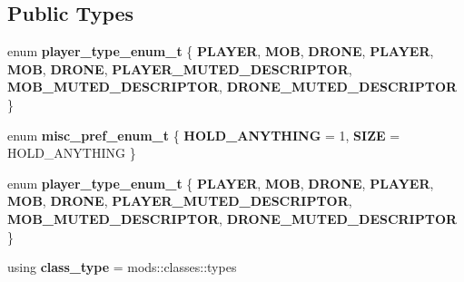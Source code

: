 \subsection*{Public Types}
\begin{DoxyCompactItemize}
\item 
\mbox{\label{classmods_1_1player_ac499124d36e96d5513a0798f12b0d1ed}} 
enum {\bfseries player\+\_\+type\+\_\+enum\+\_\+t} \{ \newline
{\bfseries P\+L\+A\+Y\+ER}, 
{\bfseries M\+OB}, 
{\bfseries D\+R\+O\+NE}, 
{\bfseries P\+L\+A\+Y\+ER}, 
\newline
{\bfseries M\+OB}, 
{\bfseries D\+R\+O\+NE}, 
{\bfseries P\+L\+A\+Y\+E\+R\+\_\+\+M\+U\+T\+E\+D\+\_\+\+D\+E\+S\+C\+R\+I\+P\+T\+OR}, 
{\bfseries M\+O\+B\+\_\+\+M\+U\+T\+E\+D\+\_\+\+D\+E\+S\+C\+R\+I\+P\+T\+OR}, 
\newline
{\bfseries D\+R\+O\+N\+E\+\_\+\+M\+U\+T\+E\+D\+\_\+\+D\+E\+S\+C\+R\+I\+P\+T\+OR}
 \}
\item 
\mbox{\label{classmods_1_1player_af6141b184d0742dc2d94dd04c390069d}} 
enum {\bfseries misc\+\_\+pref\+\_\+enum\+\_\+t} \{ {\bfseries H\+O\+L\+D\+\_\+\+A\+N\+Y\+T\+H\+I\+NG} = 1, 
{\bfseries S\+I\+ZE} = H\+O\+L\+D\+\_\+\+A\+N\+Y\+T\+H\+I\+NG
 \}
\item 
\mbox{\label{classmods_1_1player_ac499124d36e96d5513a0798f12b0d1ed}} 
enum {\bfseries player\+\_\+type\+\_\+enum\+\_\+t} \{ \newline
{\bfseries P\+L\+A\+Y\+ER}, 
{\bfseries M\+OB}, 
{\bfseries D\+R\+O\+NE}, 
{\bfseries P\+L\+A\+Y\+ER}, 
\newline
{\bfseries M\+OB}, 
{\bfseries D\+R\+O\+NE}, 
{\bfseries P\+L\+A\+Y\+E\+R\+\_\+\+M\+U\+T\+E\+D\+\_\+\+D\+E\+S\+C\+R\+I\+P\+T\+OR}, 
{\bfseries M\+O\+B\+\_\+\+M\+U\+T\+E\+D\+\_\+\+D\+E\+S\+C\+R\+I\+P\+T\+OR}, 
\newline
{\bfseries D\+R\+O\+N\+E\+\_\+\+M\+U\+T\+E\+D\+\_\+\+D\+E\+S\+C\+R\+I\+P\+T\+OR}
 \}
\item 
\mbox{\label{classmods_1_1player_a20acafc81d8553756c3b140d992c528d}} 
using {\bfseries class\+\_\+type} = mods\+::classes\+::types
\item 
\mbox{\label{classmods_1_1player_a82c7005a1c9552f9bd13fcc6db5bf745}} 

\end{DoxyCompactItemize}
